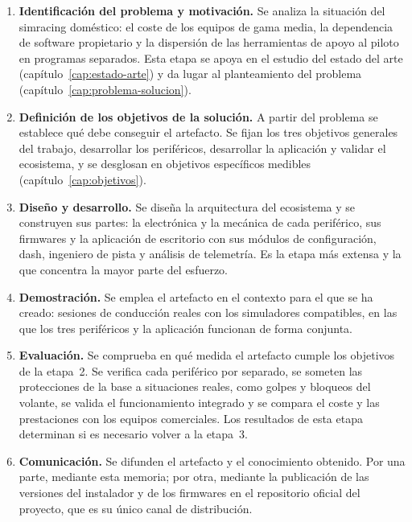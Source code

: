 \begin{enumerate}
	\item \textbf{Identificación del problema y motivación.} Se analiza la situación del simracing doméstico: el coste de los equipos de gama media, la dependencia de software propietario y la dispersión de las herramientas de apoyo al piloto en programas separados. Esta etapa se apoya en el estudio del estado del arte (capítulo~\ref{cap:estado-arte}) y da lugar al planteamiento del problema (capítulo~\ref{cap:problema-solucion}).
	
	\item \textbf{Definición de los objetivos de la solución.} A partir del problema se establece qué debe conseguir el artefacto. Se fijan los tres objetivos generales del trabajo, desarrollar los periféricos, desarrollar la aplicación y validar el ecosistema, y se desglosan en objetivos específicos medibles (capítulo~\ref{cap:objetivos}).
	
	\item \textbf{Diseño y desarrollo.} Se diseña la arquitectura del ecosistema y se construyen sus partes: la electrónica y la mecánica de cada periférico, sus firmwares y la aplicación de escritorio con sus módulos de configuración, dash, ingeniero de pista y análisis de telemetría. Es la etapa más extensa y la que concentra la mayor parte del esfuerzo.
	
	\item \textbf{Demostración.} Se emplea el artefacto en el contexto para el que se ha creado: sesiones de conducción reales con los simuladores compatibles, en las que los tres periféricos y la aplicación funcionan de forma conjunta.
	
	\item \textbf{Evaluación.} Se comprueba en qué medida el artefacto cumple los objetivos de la etapa~2. Se verifica cada periférico por separado, se someten las protecciones de la base a situaciones reales, como golpes y bloqueos del volante, se valida el funcionamiento integrado y se compara el coste y las prestaciones con los equipos comerciales. Los resultados de esta etapa determinan si es necesario volver a la etapa~3.
	
	\item \textbf{Comunicación.} Se difunden el artefacto y el conocimiento obtenido. Por una parte, mediante esta memoria; por otra, mediante la publicación de las versiones del instalador y de los firmwares en el repositorio oficial del proyecto, que es su único canal de distribución.
\end{enumerate}

